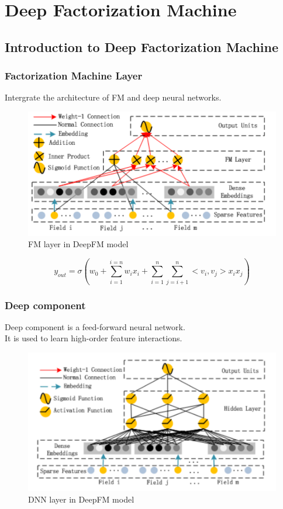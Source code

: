 \documentclass{beamer}
\begin{document}
\section{Deep Factorization Machine}
\frame{\tableofcontents[currentsection]}
\subsection{Introduction to Deep Factorization Machine}
\begin{frame}	
	\frametitle{Factorization Machine Layer}	
	Intergrate the architecture of FM and deep neural networks.	
	\begin{figure}
		\includegraphics[scale=0.25]{FM_layers}
		\caption{FM layer in DeepFM model}
	\end{figure}
	\[
	y_{out} = \sigma(w_{0} + \sum_{i=1}^{i=n} w_{i} x_{i} + \sum_{i=1}^n \sum_{j=i+1}^n<v_i, v_j>x_i x_j)
	\]
\end{frame}

\begin{frame}
	\frametitle{Deep component}
	Deep component is a feed-forward neural network. \\
	It is used to learn high-order feature interactions. \\
	\begin{figure}
		\includegraphics[scale=0.25]{deep}
		\caption{DNN layer in DeepFM model}
	\end{figure}
\end{frame}
\end{document}
